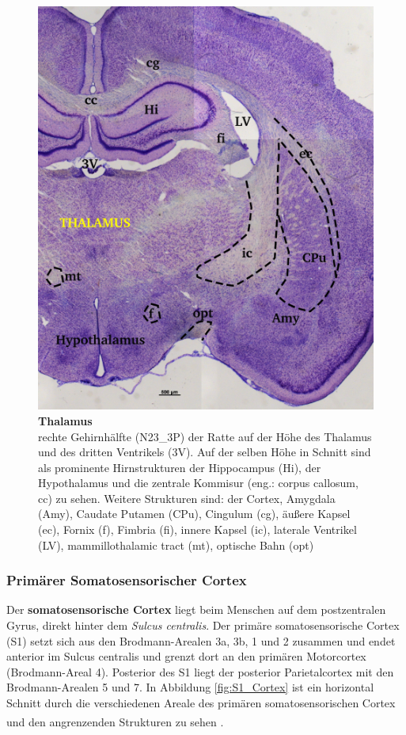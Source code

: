 \documentclass[12pt,a4paper,pdftex]{article}
\begin{document}
\begin{figure}[H]
    \centering
    \includegraphics{pictures/somatosensory/thalamus_somato.png}
    \caption[Thalamus]{\textbf{Thalamus}\\
    rechte Gehirnhälfte (N23\_3P) der Ratte auf der Höhe des Thalamus und des dritten Ventrikels (3V). Auf der selben Höhe in Schnitt sind als prominente Hirnstrukturen der Hippocampus (Hi), der Hypothalamus und die zentrale Kommisur (eng.: corpus callosum, cc) zu sehen. Weitere Strukturen sind: der Cortex, Amygdala (Amy), Caudate Putamen (CPu), Cingulum (cg), äußere Kapsel (ec), Fornix (f), Fimbria (fi), innere Kapsel (ic), laterale Ventrikel (LV), mammillothalamic tract (mt), optische Bahn (opt)}
    \label{fig:thalamus_somato}
\end{figure}

\subsubsection*{Primärer Somatosensorischer Cortex}
\label{subsubsec:S1}
Der \textbf{somatosensorische Cortex}  liegt beim Menschen auf dem postzentralen Gyrus, direkt hinter dem \textit{Sulcus centralis}. Der primäre somatosensorische Cortex (S1) setzt sich aus den Brodmann-Arealen 3a, 3b, 1 und 2 zusammen und endet anterior im Sulcus centralis und grenzt dort an den primären Motorcortex (Brodmann-Areal 4). Posterior des S1 liegt der posterior Parietalcortex mit den Brodmann-Arealen 5 und 7. In Abbildung \ref{fig:S1_Cortex} ist ein horizontal Schnitt durch die verschiedenen Areale des primären somatosensorischen Cortex und den angrenzenden Strukturen zu sehen \textsuperscript{\cite[23]{kandel2013principles}}. 
\end{document}
